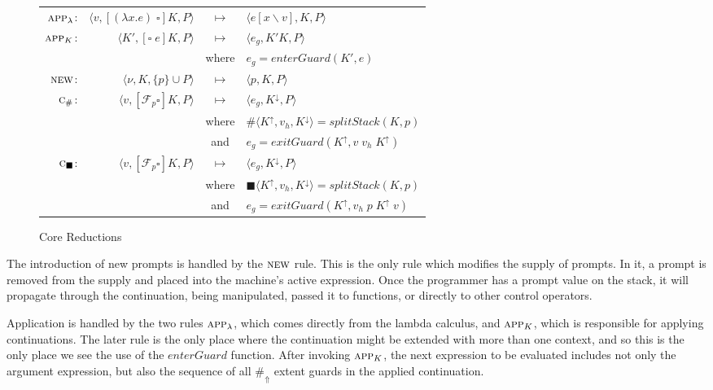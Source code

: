 \documentclass[11pt]{article}
\newcommand\F{\mathcal{F}}
\newcommand{\angles}[1]{\langle#1\rangle}
\begin{document}
\begin{figure}[H]
\caption{Core Reductions}
\label{fig:interpreter-core}
\begin{tabular}{rrcl}
$\textsc{app}_\lambda$: &
	$\angles{v, [(\lambda x.e)\;\square]K,P}$ & $\longmapsto$ &
	$\angles{e[x\backslash v],K,P}$ \\
$\textsc{app}_K$: &
	$\angles{K', [\square\;e]K,P}$ & $\longmapsto$ &
	$\angles{e_g,K'K,P}$ \\
	&& where & $e_g = enterGuard(K',e)$ \\
$\textsc{new}$: &
	$\angles{\nu, K, \{p\} \cup P}$ & $\longmapsto$ &
	$\angles{p,K,P}$ \\
$\textsc{c}_\#$: &
	$\angles{v, [\F_p\square]K, P}$ & $\longmapsto$ &
	$\angles{e_g, K^\downarrow,P}$ \\
	&& where & $\#\angles{K^\uparrow, v_h, K^\downarrow} = splitStack(K,p)$ \\
	&& and & $e_g = exitGuard(K^\uparrow,v\;v_h\;K^\uparrow)$ \\
$\textsc{c}_\blacksquare$: &
	$\angles{v, [\F_p\square]K, P}$ & $\longmapsto$ &
	$\angles{e_g, K^\downarrow,P}$ \\
	&& where & $\blacksquare\angles{K^\uparrow, v_h, K^\downarrow} = splitStack(K,p)$ \\
	&& and & $e_g = exitGuard(K^\uparrow, v_h\;p\;K^\uparrow\;v)$ \\
\end{tabular}
\end{figure}



The introduction of new prompts is handled by the $\textsc{new}$ rule.
This is the only rule which modifies the supply of prompts.
In it, a prompt is removed from the supply and placed into the machine's active expression.
Once the programmer has a prompt value on the stack, it will propagate through the continuation, being manipulated, passed it to functions, or directly to other control operators.

Application is handled by the two rules $\textsc{app}_\lambda$, which comes directly from the lambda calculus, and $\textsc{app}_K$, which is responsible for applying continuations.
The later rule is the only place where the continuation might be extended with more than one context, and so this is the only place we see the use of the $enterGuard$ function.
After invoking $\textsc{app}_K$, the next expression to be evaluated includes not only the argument expression, but also the sequence of all $\#_\Uparrow$ extent guards in the applied continuation.
\end{document}
